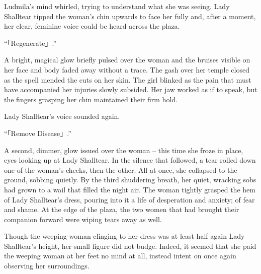  

Ludmila’s mind whirled, trying to understand what she was seeing. Lady Shalltear tipped the woman’s chin upwards to face her fully and, after a moment, her clear, feminine voice could be heard across the plaza.

 

“「Regenerate」.”

 

A bright, magical glow briefly pulsed over the woman and the bruises visible on her face and body faded away without a trace. The gash over her temple closed as the spell mended the cuts on her skin. The girl blinked as the pain that must have accompanied her injuries slowly subsided. Her jaw worked as if to speak, but the fingers grasping her chin maintained their firm hold.

 

Lady Shalltear’s voice sounded again.

 

“「Remove Disease」.”

 

A second, dimmer, glow issued over the woman – this time she froze in place, eyes looking up at Lady Shalltear. In the silence that followed, a tear rolled down one of the woman’s cheeks, then the other. All at once, she collapsed to the ground, sobbing quietly. By the third shuddering breath, her quiet, wracking sobs had grown to a wail that filled the night air. The woman tightly grasped the hem of Lady Shalltear's dress, pouring into it a life of desperation and anxiety; of fear and shame. At the edge of the plaza, the two women that had brought their companion forward were wiping tears away as well.

 

Though the weeping woman clinging to her dress was at least half again Lady Shalltear’s height, her small figure did not budge. Indeed, it seemed that she paid the weeping woman at her feet no mind at all, instead intent on once again observing her surroundings.